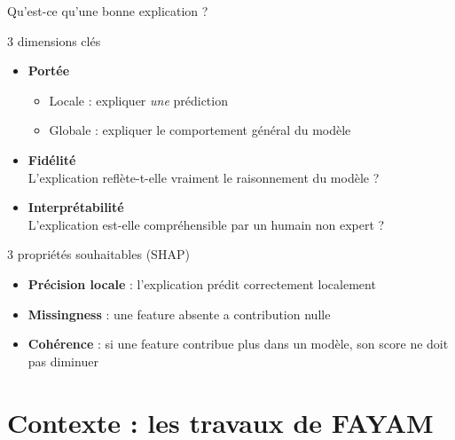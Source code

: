 \documentclass[10pt]{beamer}
\begin{document}
\begin{frame}{Qu'est-ce qu'une bonne explication ?}
	\begin{block}{3 dimensions clés}
		\begin{itemize}
			\item \textbf{Portée}
			\begin{itemize}
				\item \alert{Locale} : expliquer \textit{une} prédiction
				\item \alert{Globale} : expliquer le comportement général du modèle
			\end{itemize}
			\item \textbf{Fidélité}\\
			L'explication reflète-t-elle vraiment le raisonnement du modèle ?
			\item \textbf{Interprétabilité}\\
			L'explication est-elle compréhensible par un humain non expert ?
		\end{itemize}
	\end{block}
	
	\vspace{8pt}
	
	\begin{exampleblock}{3 propriétés souhaitables (SHAP)}
		\begin{itemize}
			\item \textbf{Précision locale} : l'explication prédit correctement localement
			\item \textbf{Missingness} : une feature absente a contribution nulle
			\item \textbf{Cohérence} : si une feature contribue plus dans un modèle,
			son score ne doit pas diminuer
		\end{itemize}
	\end{exampleblock}
\end{frame}


\section{Contexte : les travaux de FAYAM}
\end{document}
